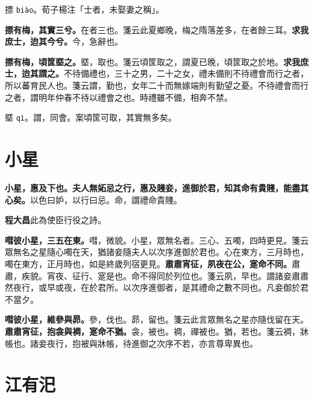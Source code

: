 \begin{quoting}摽 \texttt{biào}。荀子楊注「士者，未娶妻之稱」。\end{quoting}

\textbf{摽有梅，其實三兮。}{\footnotesize 在者三也。箋云此夏鄉晚，梅之隋落差多，在者餘三耳。}\textbf{求我庶士，迨其今兮。}{\footnotesize 今，急辭也。}

\textbf{摽有梅，頃筐塈之。}{\footnotesize 塈，取也。箋云頃筐取之，謂夏已晚，頃筐取之於地。}\textbf{求我庶士，迨其謂之。}{\footnotesize 不待備禮也，三十之男，二十之女，禮未備則不待禮會而行之者，所以蕃育民人也。箋云謂，勤也，女年二十而無嫁端則有勤望之憂。不待禮會而行之者，謂明年仲春不待以禮會之也。時禮雖不備，相奔不禁。}

\begin{quoting}塈 \texttt{qì}。謂，同會。案頃筐可取，其實無多矣。\end{quoting}

\section{小星}


\textbf{小星，惠及下也。夫人無妬忌之行，惠及賤妾，進御於君，知其命有貴賤，能盡其心矣。}{\footnotesize 以色曰妒，以行曰忌。命，謂禮命貴賤。}

\begin{quoting}\textbf{程大昌}此為使臣行役之詩。\end{quoting}

\textbf{嘒彼小星，三五在東。}{\footnotesize 嘒，微貌。小星，眾無名者。三心、五噣，四時更見。箋云眾無名之星隨心噣在天，猶諸妾隨夫人以次序進御於君也。心在東方，三月時也，噣在東方，正月時也，如是終歲列宿更見。}\textbf{肅肅宵征，夙夜在公，寔命不同。}{\footnotesize 肅肅，疾貌。宵夜、征行、寔是也。命不得同於列位也。箋云夙，早也。謂諸妾肅肅然夜行，或早或夜，在於君所。以次序進御者，是其禮命之數不同也。凡妾御於君不當夕。}

\textbf{嘒彼小星，維參與昴。}{\footnotesize 參，伐也。昴，留也。箋云此言眾無名之星亦隨伐留在天。}\textbf{肅肅宵征，抱衾與裯，寔命不猶。}{\footnotesize 衾，被也。裯，禪被也。猶，若也。箋云裯，牀帳也。諸妾夜行，抱被與牀帳，待進御之次序不若，亦言尊卑異也。}

\section{江有汜}


